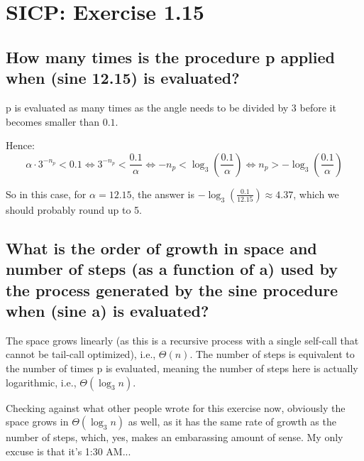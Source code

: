 \documentclass[12pt,a4paper]{article}
\begin{document}
\section*{SICP: Exercise 1.15}

\subsection*{How many times is the procedure p applied when (sine 12.15) is evaluated?}
p is evaluated as many times as the angle needs to be divided by 3 before it becomes smaller than $0.1$.

Hence:
\[
	\alpha \cdot 3^{-n_p} < 0.1 \Leftrightarrow 3^{-n_p} < \frac{0.1}{\alpha} \Leftrightarrow -n_p < \log_3\left(\frac{0.1}{\alpha}\right) \Leftrightarrow n_p > -\log_3\left(\frac{0.1}{\alpha}\right)
\]

So in this case, for $\alpha = 12.15$, the answer is $-\log_3(\frac{0.1}{12.15}) \approx 4.37$, which we should probably round up to 5.

\subsection*{What is the order of growth in space and number of steps (as a function of a) used by the process generated by the sine procedure when (sine a) is evaluated?}

The space grows linearly (as this is a recursive process with a single self-call that cannot be tail-call optimized), i.e., $\Theta(n)$.
The number of steps is equivalent to the number of times p is evaluated, meaning the number of steps here is actually logarithmic, i.e., $\Theta(\log_3 n)$.

Checking against what other people wrote for this exercise now, obviously the space grows in $\Theta(\log_3 n)$ as well, as it has the same rate of growth as the number of steps, which, yes, makes an embarassing amount of sense.
My only excuse is that it's 1:30 AM...
\end{document}
